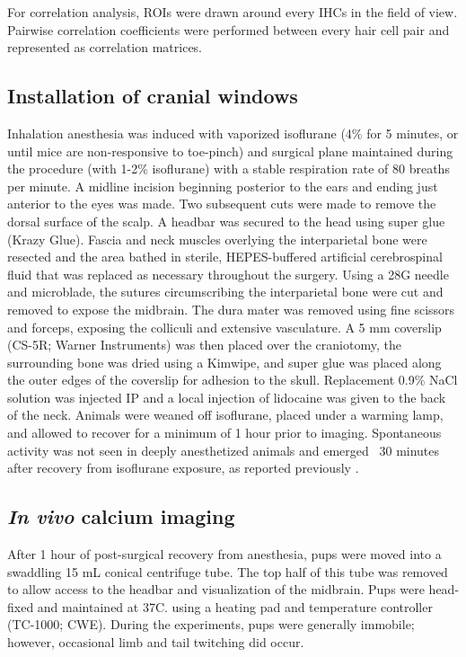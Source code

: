 \documentclass[9pt,lineno]{elife}
\begin{document}
For correlation analysis, ROIs were drawn around every IHCs in the field of view. Pairwise correlation coefficients were performed between every hair cell pair and represented as correlation matrices.

\subsection{Installation of cranial windows}
Inhalation anesthesia was induced with vaporized isoflurane (4\% for 5 minutes, or until mice are non-responsive to toe-pinch) and surgical plane maintained during the procedure (with 1-2\% isoflurane) with a stable respiration rate of 80 breaths per minute. A midline incision beginning posterior to the ears and ending just anterior to the eyes was made. Two subsequent cuts were made to remove the dorsal surface of the scalp. A headbar was secured to the head using super glue (Krazy Glue). Fascia and neck muscles overlying the interparietal bone were resected and the area bathed in sterile, HEPES-buffered artificial cerebrospinal fluid that was replaced as necessary throughout the surgery. Using a 28G needle and microblade, the sutures circumscribing the interparietal bone were cut and removed to expose the midbrain. The dura mater was removed using fine scissors and forceps, exposing the colliculi and extensive vasculature. A 5 mm coverslip (CS-5R; Warner Instruments) was then placed over the craniotomy, the surrounding bone was dried using a Kimwipe, and super glue was placed along the outer edges of the coverslip for adhesion to the skull. Replacement 0.9\% NaCl solution was injected IP and a local injection of lidocaine was given to the back of the neck. Animals were weaned off isoflurane, placed under a warming lamp, and allowed to recover for a minimum of 1 hour prior to imaging. Spontaneous activity was not seen in deeply anesthetized animals and emerged ~30 minutes after recovery from isoflurane exposure, as reported previously \citep{Ackman2012}.

\subsection{\textit{In vivo} calcium imaging}
After 1 hour of post-surgical recovery from anesthesia, pups were moved into a swaddling 15 mL conical centrifuge tube. The top half of this tube was removed to allow access to the headbar and visualization of the midbrain. Pups were head-fixed and maintained at 37\textdegree C. using a heating pad and temperature controller (TC-1000; CWE). During the experiments, pups were generally immobile; however, occasional limb and tail twitching did occur.
\end{document}
